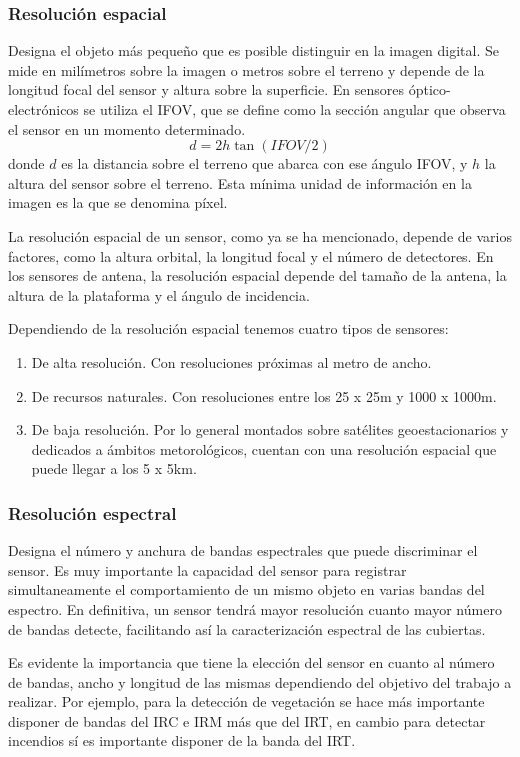 \subsubsection{Resolución espacial}
Designa el objeto más pequeño que es posible distinguir en la imagen digital. Se mide en milímetros sobre la imagen o metros sobre el terreno y depende de la longitud focal del sensor y altura sobre la superficie. En sensores óptico-electrónicos se utiliza el \ac{IFOV}, que se define como la sección angular que observa el sensor en un momento determinado.
\begin{equation}
	d=2h\tan(IFOV/2)
	\label{eq:res_esp}
\end{equation}
donde $d$ es la distancia sobre el terreno que abarca con ese ángulo \ac{IFOV}, y $h$ la altura del sensor sobre el terreno. Esta mínima unidad de información en la imagen es la que se denomina píxel.\Sep

La resolución espacial de un sensor, como ya se ha mencionado, depende de varios factores, como la altura orbital, la longitud focal y el número de detectores. En los sensores de antena, la resolución espacial depende del tamaño de la antena, la altura de la plataforma y el ángulo de incidencia.\Sep

Dependiendo de la resolución espacial tenemos cuatro tipos de sensores:
\begin{enumerate}
	\item De alta resolución. Con resoluciones próximas al metro de ancho.
	\item De recursos naturales. Con resoluciones entre los 25 x 25m y 1000 x 1000m.
	\item De baja resolución. Por lo general montados sobre satélites geoestacionarios y dedicados a ámbitos metorológicos, cuentan con una resolución espacial que puede llegar a los 5 x 5km.
\end{enumerate}

\subsubsection{Resolución espectral}
Designa el número y anchura de bandas espectrales que puede discriminar el sensor. Es muy importante la capacidad del sensor para registrar simultaneamente el comportamiento de un mismo objeto en varias bandas del espectro. En definitiva, un sensor tendrá mayor resolución cuanto mayor número de bandas detecte, facilitando así la caracterización espectral de las cubiertas.\Sep

Es evidente la importancia que tiene la elección del sensor en cuanto al número de bandas, ancho y longitud de las mismas dependiendo del objetivo del trabajo a realizar. Por ejemplo, para la detección de vegetación se hace más importante disponer de bandas del \ac{IRC} e \ac{IRM} más que del \ac{IRT}, en cambio para detectar incendios sí es importante disponer de la banda del \ac{IRT}.

